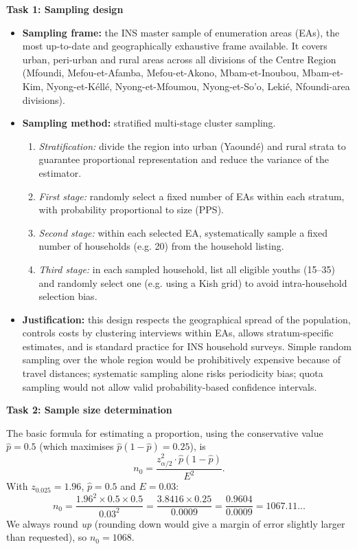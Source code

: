 \documentclass[11pt]{article}
\newcommand{\cle}[1]{{\popxbold\color{popdark}#1}}
\begin{document}
\textbf{Task 1: Sampling design}
\begin{itemize}
    \item \textbf{Sampling frame:} the INS master sample of enumeration areas (EAs), the most up-to-date and geographically exhaustive frame available. It covers urban, peri-urban and rural areas across all divisions of the Centre Region (Mfoundi, Mefou-et-Afamba, Mefou-et-Akono, Mbam-et-Inoubou, Mbam-et-Kim, Nyong-et-K\'ell\'e, Nyong-et-Mfoumou, Nyong-et-So'o, Leki\'e, Nfoundi-area divisions).
    \item \textbf{Sampling method:} \cle{stratified multi-stage cluster sampling}.
        \begin{enumerate}
            \item \emph{Stratification:} divide the region into urban (Yaound\'e) and rural strata to guarantee proportional representation and reduce the variance of the estimator.
            \item \emph{First stage:} randomly select a fixed number of EAs within each stratum, with probability proportional to size (PPS).
            \item \emph{Second stage:} within each selected EA, systematically sample a fixed number of households (e.g. 20) from the household listing.
            \item \emph{Third stage:} in each sampled household, list all eligible youths (15--35) and randomly select one (e.g. using a Kish grid) to avoid intra-household selection bias.
        \end{enumerate}
    \item \textbf{Justification:} this design respects the geographical spread of the population, controls costs by clustering interviews within EAs, allows stratum-specific estimates, and is standard practice for INS household surveys. Simple random sampling over the whole region would be prohibitively expensive because of travel distances; systematic sampling alone risks periodicity bias; quota sampling would not allow valid probability-based confidence intervals.
\end{itemize}

\textbf{Task 2: Sample size determination}

The basic formula for estimating a proportion, using the conservative value $\hat{p}=0.5$ (which maximises $\hat{p}(1-\hat{p})=0.25$), is
\[
n_0 = \frac{z_{\alpha/2}^2 \cdot \hat{p}(1-\hat{p})}{E^2}.
\]
With $z_{0.025}=1.96$, $\hat{p}=0.5$ and $E=0.03$:
\[
n_0 = \frac{1.96^2 \times 0.5 \times 0.5}{0.03^2}
    = \frac{3.8416 \times 0.25}{0.0009}
    = \frac{0.9604}{0.0009}
    = 1067.11\ldots
\]
We always round \emph{up} (rounding down would give a margin of error slightly larger than requested), so $n_0 = 1068$.
\end{document}
